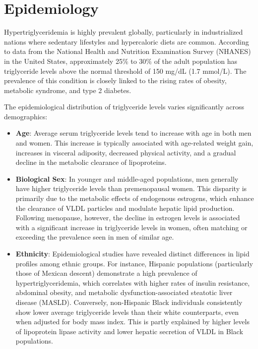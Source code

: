 \section*{Epidemiology}
Hypertriglyceridemia is highly prevalent globally, particularly in industrialized nations where sedentary lifestyles and hypercaloric diets are common. According to data from the National Health and Nutrition Examination Survey (NHANES) in the United States, approximately 25\% to 30\% of the adult population has triglyceride levels above the normal threshold of 150 mg/dL (1.7 mmol/L). The prevalence of this condition is closely linked to the rising rates of obesity, metabolic syndrome, and type 2 diabetes.

The epidemiological distribution of triglyceride levels varies significantly across demographics:
\begin{itemize}
    \item \textbf{Age}: Average serum triglyceride levels tend to increase with age in both men and women. This increase is typically associated with age-related weight gain, increases in visceral adiposity, decreased physical activity, and a gradual decline in the metabolic clearance of lipoproteins.
    \item \textbf{Biological Sex}: In younger and middle-aged populations, men generally have higher triglyceride levels than premenopausal women. This disparity is primarily due to the metabolic effects of endogenous estrogens, which enhance the clearance of VLDL particles and modulate hepatic lipid production. Following menopause, however, the decline in estrogen levels is associated with a significant increase in triglyceride levels in women, often matching or exceeding the prevalence seen in men of similar age.
    \item \textbf{Ethnicity}: Epidemiological studies have revealed distinct differences in lipid profiles among ethnic groups. For instance, Hispanic populations (particularly those of Mexican descent) demonstrate a high prevalence of hypertriglyceridemia, which correlates with higher rates of insulin resistance, abdominal obesity, and metabolic dysfunction-associated steatotic liver disease (MASLD). Conversely, non-Hispanic Black individuals consistently show lower average triglyceride levels than their white counterparts, even when adjusted for body mass index. This is partly explained by higher levels of lipoprotein lipase activity and lower hepatic secretion of VLDL in Black populations.
\end{itemize}

